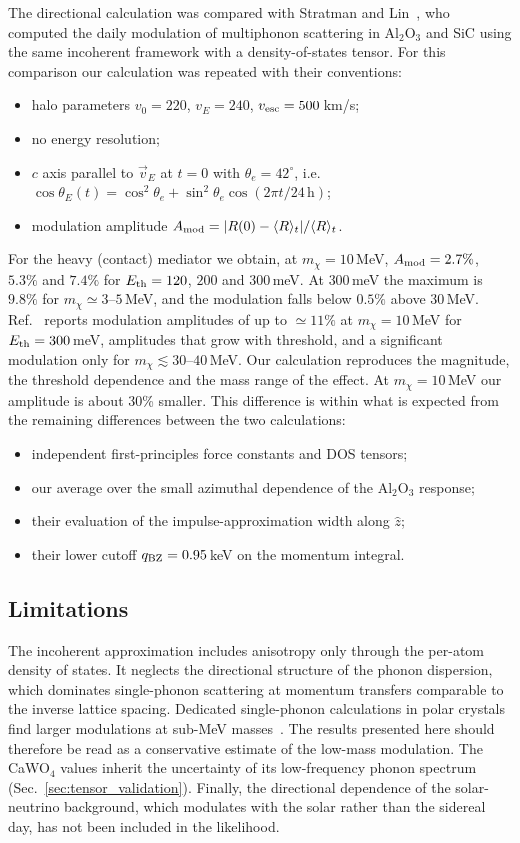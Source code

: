 The directional calculation was compared with Stratman and Lin~\cite{StratmanLin2024},
who computed the daily modulation of multiphonon scattering in Al$_2$O$_3$ and SiC using
the same incoherent framework with a density-of-states tensor. For this comparison our
calculation was repeated with their conventions:
\begin{itemize}
  \item halo parameters $v_0=220$, $v_E=240$, $v_{\rm esc}=500$\,km/s;
  \item no energy resolution;
  \item $c$ axis parallel to $\vec v_E$ at $t=0$ with $\theta_e = 42^\circ$, i.e.\
  $\cos\theta_E(t)=\cos^2\theta_e+\sin^2\theta_e\cos(2\pi t/24\,\mathrm{h})$;
  \item modulation amplitude $A_{\rm mod} = |R(0)-\langle R\rangle_t|/\langle R\rangle_t$.
\end{itemize}
For the heavy (contact) mediator we obtain, at $m_\chi=10$\,MeV,
$A_{\rm mod} = 2.7\%$, $5.3\%$ and $7.4\%$ for $E_{\rm th}=120$, $200$ and $300$\,meV.
At $300$\,meV the maximum is $9.8\%$ for $m_\chi\simeq 3$--$5$\,MeV, and the modulation
falls below $0.5\%$ above $30$\,MeV. Ref.~\cite{StratmanLin2024} reports modulation
amplitudes of up to $\simeq 11\%$ at $m_\chi = 10$\,MeV for $E_{\rm th}=300$\,meV,
amplitudes that grow with threshold, and a significant modulation only for
$m_\chi\lesssim 30$--$40$\,MeV. Our calculation reproduces the magnitude, the threshold
dependence and the mass range of the effect. At $m_\chi=10$\,MeV our amplitude is about
30\% smaller. This difference is within what is expected from the remaining differences
between the two calculations:
\begin{itemize}
  \item independent first-principles force constants and DOS tensors;
  \item our average over the small azimuthal dependence of the Al$_2$O$_3$ response;
  \item their evaluation of the impulse-approximation width along $\hat z$;
  \item their lower cutoff $q_{\rm BZ}=0.95$\,keV on the momentum integral.
\end{itemize}

\subsection{Limitations}

The incoherent approximation includes anisotropy only through the per-atom density of
states. It neglects the directional structure of the phonon dispersion, which dominates
single-phonon scattering at momentum transfers comparable to the inverse lattice
spacing. Dedicated single-phonon calculations in polar crystals find larger modulations
at sub-MeV masses~\cite{Griffin2018Directional}. The results presented here should
therefore be read as a conservative estimate of the low-mass modulation. The CaWO$_4$
values inherit the uncertainty of its low-frequency phonon spectrum
(Sec.~\ref{sec:tensor_validation}). Finally, the directional dependence of the
solar-neutrino background, which modulates with the solar rather than the sidereal day,
has not been included in the likelihood.

